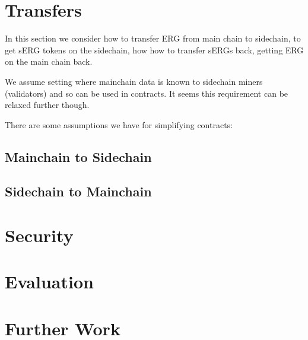 \documentclass{article}   %
\begin{document}
\section{Transfers}

In this section we consider how to transfer ERG from main chain to sidechain, to get sERG tokens on the sidechain, how
how to transfer sERGs back, getting ERG on the main chain back.

We assume setting where mainchain data is known to sidechain miners (validators) and so can be used in contracts. It seems
this requirement can be relaxed further though.

There are some assumptions we have for simplifying contracts:


\subsection{Mainchain to Sidechain}

\subsection{Sidechain to Mainchain}

\section{Security}

\section{Evaluation}

\section{Further Work}



\newpage

 
\end{document}
